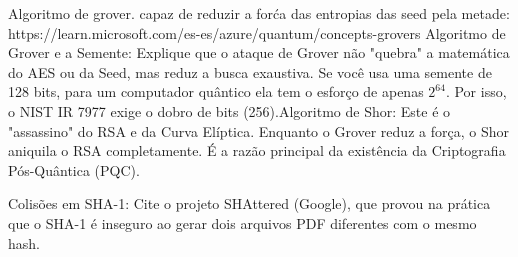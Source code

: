             Algoritmo de grover. capaz de reduzir a forća das entropias das seed pela metade: https://learn.microsoft.com/es-es/azure/quantum/concepts-grovers
            Algoritmo de Grover e a Semente: Explique que o ataque de Grover não "quebra" a matemática do AES ou da Seed, mas reduz a busca exaustiva. 
            Se você usa uma semente de 128 bits, para um computador quântico ela tem o esforço de apenas $2^{64}$. 
            Por isso, o NIST IR 7977 exige o dobro de bits (256).Algoritmo de Shor: Este é o "assassino" do RSA e da Curva Elíptica. 
            Enquanto o Grover reduz a força, o Shor aniquila o RSA completamente. É a razão principal da existência da Criptografia Pós-Quântica (PQC).
        
            Colisões em SHA-1: Cite o projeto SHAttered (Google), que provou na prática que o SHA-1 é inseguro ao gerar dois arquivos PDF diferentes com o mesmo hash.
